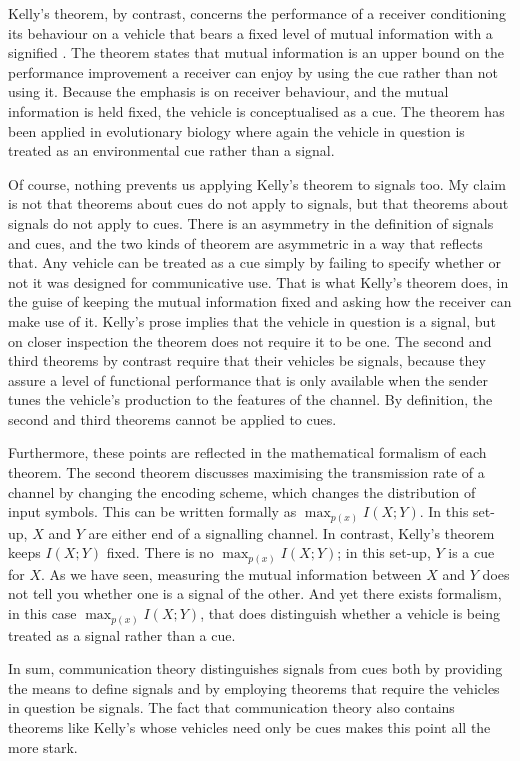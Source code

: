 Kelly's theorem, by contrast, concerns the performance of a receiver conditioning its behaviour on a vehicle that bears a fixed level of mutual information with a signified \citep{kelly1956new}.
The theorem states that mutual information is an upper bound on the performance improvement a receiver can enjoy by using the cue rather than not using it.
Because the emphasis is on receiver behaviour, and the mutual information is held fixed, the vehicle is conceptualised as a cue.
The theorem has been applied in evolutionary biology \citep{donaldson-matasci2010fitness} where again the vehicle in question is treated as an environmental cue rather than a signal.

Of course, nothing prevents us applying Kelly's theorem to signals too.
My claim is not that theorems about cues do not apply to signals, but that theorems about signals do not apply to cues.
There is an asymmetry in the definition of signals and cues, and the two kinds of theorem are asymmetric in a way that reflects that.
Any vehicle can be treated as a cue simply by failing to specify whether or not it was designed for communicative use.
That is what Kelly's theorem does, in the guise of keeping the mutual information fixed and asking how the receiver can make use of it.
Kelly's prose implies that the vehicle in question is a signal, but on closer inspection the theorem does not require it to be one.
The second and third theorems by contrast require that their vehicles be signals, because they assure a level of functional performance that is only available when the sender tunes the vehicle's production to the features of the channel.
By definition, the second and third theorems cannot be applied to cues.

Furthermore, these points are reflected in the mathematical formalism of each theorem.
The second theorem discusses maximising the transmission rate of a channel by changing the encoding scheme, which changes the distribution of input symbols.
This can be written formally as $\max_{p(x)}I(X;Y)$.
In this set-up, $X$ and $Y$ are either end of a signalling channel.
In contrast, Kelly's theorem keeps $I(X;Y)$ fixed.
There is no $\max_{p(x)}I(X;Y)$; in this set-up, $Y$ is a cue for $X$.
As we have seen, measuring the mutual information between $X$ and $Y$ does not tell you whether one is a signal of the other.
And yet there exists formalism, in this case $\max_{p(x)}I(X;Y)$, that does distinguish whether a vehicle is being treated as a signal rather than a cue.

In sum, communication theory distinguishes signals from cues both by providing the means to define signals and by employing theorems that require the vehicles in question be signals.
The fact that communication theory also contains theorems like Kelly's whose vehicles need only be cues makes this point all the more stark.


